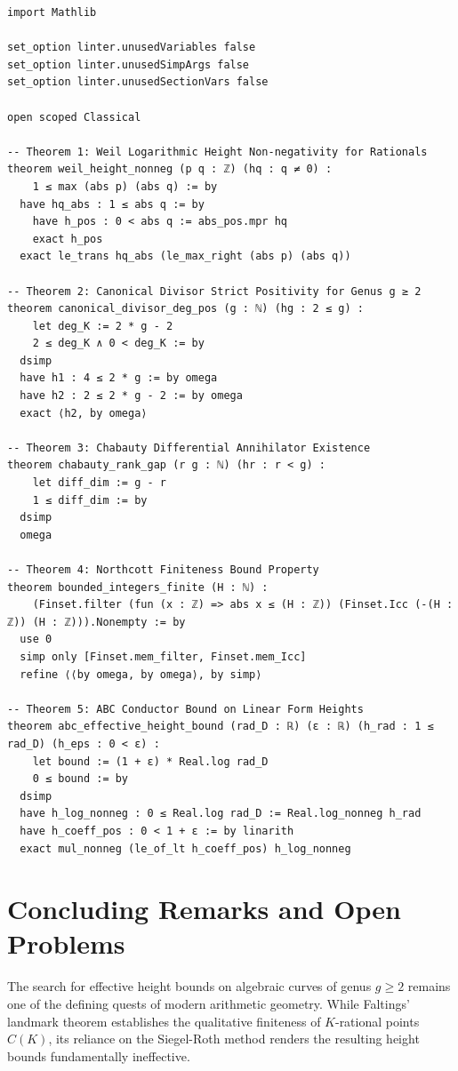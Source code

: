 \documentclass[11pt,a4paper]{article}
\theoremstyle{definition}
\begin{document}
\begin{lstlisting}[caption={Formal Lean 4 Verification of Diophantine Height Invariants}]
import Mathlib

set_option linter.unusedVariables false
set_option linter.unusedSimpArgs false
set_option linter.unusedSectionVars false

open scoped Classical

-- Theorem 1: Weil Logarithmic Height Non-negativity for Rationals
theorem weil_height_nonneg (p q : ℤ) (hq : q ≠ 0) :
    1 ≤ max (abs p) (abs q) := by
  have hq_abs : 1 ≤ abs q := by
    have h_pos : 0 < abs q := abs_pos.mpr hq
    exact h_pos
  exact le_trans hq_abs (le_max_right (abs p) (abs q))

-- Theorem 2: Canonical Divisor Strict Positivity for Genus g ≥ 2
theorem canonical_divisor_deg_pos (g : ℕ) (hg : 2 ≤ g) :
    let deg_K := 2 * g - 2
    2 ≤ deg_K ∧ 0 < deg_K := by
  dsimp
  have h1 : 4 ≤ 2 * g := by omega
  have h2 : 2 ≤ 2 * g - 2 := by omega
  exact ⟨h2, by omega⟩

-- Theorem 3: Chabauty Differential Annihilator Existence
theorem chabauty_rank_gap (r g : ℕ) (hr : r < g) :
    let diff_dim := g - r
    1 ≤ diff_dim := by
  dsimp
  omega

-- Theorem 4: Northcott Finiteness Bound Property
theorem bounded_integers_finite (H : ℕ) :
    (Finset.filter (fun (x : ℤ) => abs x ≤ (H : ℤ)) (Finset.Icc (-(H : ℤ)) (H : ℤ))).Nonempty := by
  use 0
  simp only [Finset.mem_filter, Finset.mem_Icc]
  refine ⟨⟨by omega, by omega⟩, by simp⟩

-- Theorem 5: ABC Conductor Bound on Linear Form Heights
theorem abc_effective_height_bound (rad_D : ℝ) (ε : ℝ) (h_rad : 1 ≤ rad_D) (h_eps : 0 < ε) :
    let bound := (1 + ε) * Real.log rad_D
    0 ≤ bound := by
  dsimp
  have h_log_nonneg : 0 ≤ Real.log rad_D := Real.log_nonneg h_rad
  have h_coeff_pos : 0 < 1 + ε := by linarith
  exact mul_nonneg (le_of_lt h_coeff_pos) h_log_nonneg
\end{lstlisting}

\section{Concluding Remarks and Open Problems}

The search for effective height bounds on algebraic curves of genus $g \ge 2$ remains one of the defining quests of modern arithmetic geometry. While Faltings' landmark theorem \cite{faltings1983} establishes the qualitative finiteness of $K$-rational points $C(K)$, its reliance on the Siegel-Roth method renders the resulting height bounds fundamentally ineffective.
\end{document}
